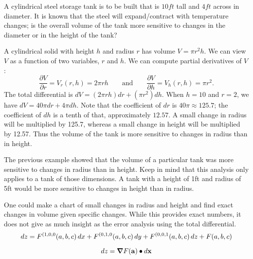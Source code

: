 \documentclass{ximera}
\begin{document}
\begin{example}
  A cylindrical steel storage tank is to be built that is
  $10\unit{ft}$ tall and $4\unit{ft}$ across in diameter. It is known
  that the steel will expand/contract with temperature changes; is the
  overall volume of the tank more sensitive to changes in the diameter
  or in the height of the tank?
  \begin{explanation}
    A cylindrical solid with height $h$ and radius $r$ has volume $V =
    \pi r^2h$. We can view $V$ as a function of two variables, $r$ and
    $h$. We can compute partial derivatives of $V$:
    \[
    \frac{\partial V}{\partial r} = V_r(r,h) = 2\pi rh \qquad \text{and}\qquad \frac{\partial V}{\partial h} = V_h(r,h) = \pi r^2.
    \]
    The total differential is $dV = (2\pi rh)dr + (\pi r^2)dh.$ When
    $h = 10$ and $r = 2$, we have $dV = 40\pi dr + 4\pi dh$.  Note
    that the coefficient of $dr$ is $40\pi\approx 125.7$; the
    coefficient of $dh$ is a tenth of that, approximately $12.57$. A
    small change in radius will be multiplied by 125.7, whereas a
    small change in height will be multiplied by 12.57. Thus the
    volume of the tank is more sensitive to changes in radius than in
    height.
  \end{explanation}
\end{example}

The previous example showed that the volume of a particular tank was more sensitive to changes in radius than in height. Keep in mind that this analysis only applies to a tank of those dimensions. A tank with a height of 1ft and radius of 5ft would be more sensitive to changes in height than in radius.

One could make a chart of small changes in radius and height and find exact changes in volume given specific changes. While this provides exact numbers, it does not give as much insight as the error analysis using the total differential.\\




\[
\mathop{}\!d z = F^{(1,0,0}(a,b,c)\mathop{}\!d x + F^{(0,1,0}(a,b,c)\mathop{}\!d y+
F^{(0,0,1}(a,b,c)\mathop{}\!d z + F(a,b,c)
\]

\[
\mathop{}\!d z = \boldsymbol\nabla F(\mathbf{a}) \bullet \mathop{}\!d \mathbf{x}
\]
\end{document}
